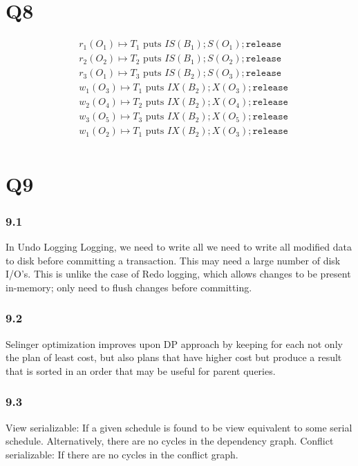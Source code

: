 \documentclass{article}
\begin{document}
\section{Q8}
\begin{align*}
    &r_1(O_1) \mapsto \text{$T_1$ puts }IS(B_1); S(O_1); \texttt{release} \\
    &r_2(O_2) \mapsto \text{$T_2$ puts }IS(B_1); S(O_2); \texttt{release}\\
    &r_3(O_1) \mapsto \text{$T_3$ puts }IS(B_2); S(O_3); \texttt{release}\\
    &w_1(O_3) \mapsto \text{$T_1$ puts }IX(B_2); X(O_3); \texttt{release}\\
    &w_2(O_4) \mapsto \text{$T_2$ puts }IX(B_2); X(O_4); \texttt{release}\\
    &w_3(O_5) \mapsto \text{$T_3$ puts }IX(B_2); X(O_5); \texttt{release}\\
    &w_1(O_2) \mapsto \text{$T_1$ puts }IX(B_2); X(O_3); \texttt{release}\\
\end{align*}
\section{Q9}
\subsubsection{9.1}
In Undo Logging Logging, we need to write all we need to write all modified
data to disk before committing a transaction.  This may need a large number of disk
I/O’s. This is unlike the case of Redo logging, which allows changes to be
present in-memory; only need to flush changes before committing.

\subsubsection{9.2}
Selinger optimization improves upon DP approach by keeping for
each  not only the plan of least cost, but also plans that have higher
cost but produce a result that is sorted in an order that may
be useful for parent queries.
\subsubsection{9.3}

View serializable: If a given schedule is found to be view equivalent to some serial schedule. Alternatively,
  there are no cycles in the dependency graph.
Conflict serializable: If there are no cycles in the conflict graph.
\end{document}
